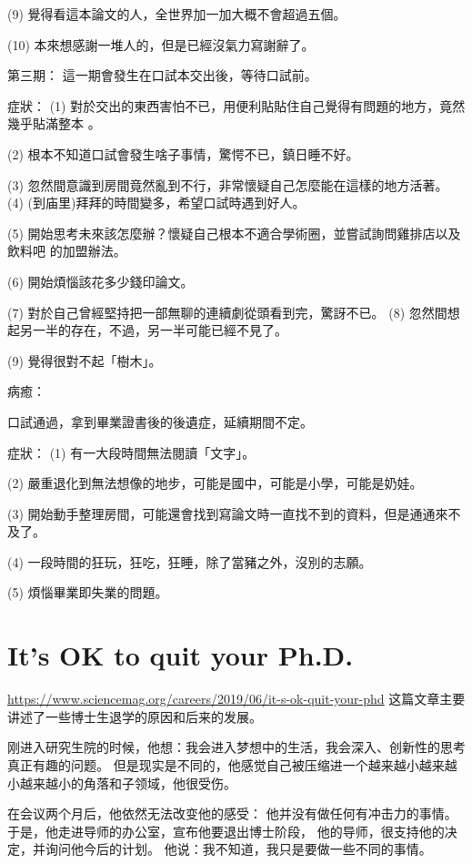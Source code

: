 (9) 覺得看這本論文的人，全世界加一加大概不會超過五個。

(10) 本來想感謝一堆人的，但是已經沒氣力寫謝辭了。

第三期：
這一期會發生在口試本交出後，等待口試前。

症狀：
(1) 對於交出的東西害怕不已，用便利貼貼住自己覺得有問題的地方，竟然幾乎貼滿整本
。

(2) 根本不知道口試會發生啥子事情，驚愕不已，鎮日睡不好。

(3) 忽然間意識到房間竟然亂到不行，非常懷疑自己怎麼能在這樣的地方活著。
(4) (到庙里)拜拜的時間變多，希望口試時遇到好人。

(5) 開始思考未來該怎麼辦？懷疑自己根本不適合學術圈，並嘗試詢問雞排店以及飲料吧
的加盟辦法。

(6) 開始煩惱該花多少錢印論文。

(7) 對於自己曾經堅持把一部無聊的連續劇從頭看到完，驚訝不已。
(8) 忽然間想起另一半的存在，不過，另一半可能已經不見了。

(9) 覺得很對不起「樹木」。

病癒：

口試通過，拿到畢業證書後的後遺症，延續期間不定。

症狀：
(1) 有一大段時間無法閱讀「文字」。

(2) 嚴重退化到無法想像的地步，可能是國中，可能是小學，可能是奶娃。

(3) 開始動手整理房間，可能還會找到寫論文時一直找不到的資料，但是通通來不及了。

(4) 一段時間的狂玩，狂吃，狂睡，除了當豬之外，沒別的志願。

(5) 煩惱畢業即失業的問題。







\section{It’s OK to quit your Ph.D.}

\url{https://www.sciencemag.org/careers/2019/06/it-s-ok-quit-your-phd}
这篇文章主要讲述了一些博士生退学的原因和后来的发展。

刚进入研究生院的时候，他想：我会进入梦想中的生活，我会深入、创新性的思考真正有趣的问题。
但是现实是不同的，他感觉自己被压缩进一个越来越小越来越小越来越小的角落和子领域，他很受伤。

在会议两个月后，他依然无法改变他的感受： 他并没有做任何有冲击力的事情。
于是，他走进导师的办公室，宣布他要退出博士阶段，
他的导师，很支持他的决定，并询问他今后的计划。
他说：我不知道，我只是要做一些不同的事情。

